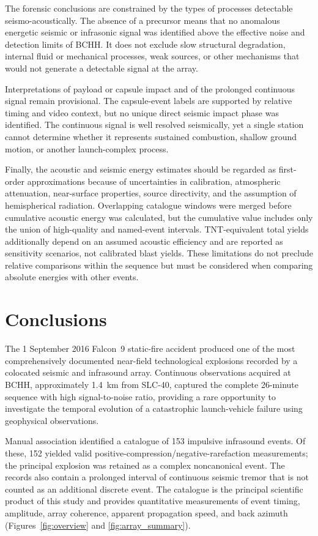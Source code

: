\documentclass[]{seismica}
\begin{document}
The forensic conclusions are constrained by the types of processes detectable
seismo-acoustically. The absence of a precursor means that no anomalous
energetic seismic or infrasonic signal was identified above the effective noise
and detection limits of BCHH. It does not exclude slow structural degradation,
internal fluid or mechanical processes, weak sources, or other mechanisms that
would not generate a detectable signal at the array.

Interpretations of payload or capsule impact and of the prolonged continuous
signal remain provisional. The capsule-event labels are supported by relative
timing and video context, but no unique direct seismic impact phase was
identified. The continuous signal is well resolved seismically, yet a single
station cannot determine whether it represents sustained combustion, shallow
ground motion, or another launch-complex process.

Finally, the acoustic and seismic energy estimates should be regarded as
first-order approximations because of uncertainties in calibration,
atmospheric attenuation, near-surface properties, source directivity, and the
assumption of hemispherical radiation. Overlapping catalogue windows were
merged before cumulative acoustic energy was calculated, but the cumulative
value includes only the union of high-quality and named-event intervals.
TNT-equivalent total yields additionally depend on an assumed acoustic
efficiency and are reported as sensitivity scenarios, not calibrated blast
yields. These limitations do not preclude relative comparisons within the
sequence but must be considered when comparing absolute energies with other
events.

\section{Conclusions}
\label{sec:conclusions}

The 1 September 2016 Falcon~9 static-fire accident produced one of the most comprehensively documented near-field technological explosions recorded by a colocated seismic and infrasound array. Continuous observations acquired at BCHH, approximately 1.4~km from SLC-40, captured the complete 26-minute sequence with high signal-to-noise ratio, providing a rare opportunity to investigate the temporal evolution of a catastrophic launch-vehicle failure using geophysical observations.

Manual association identified a catalogue of 153 impulsive infrasound events.
Of these, 152 yielded valid positive-compression/negative-rarefaction
measurements; the principal explosion was retained as a complex noncanonical
event. The records also contain a prolonged interval of continuous seismic
tremor that is not counted as an additional discrete event. The catalogue is
the principal scientific product of this study and provides quantitative
measurements of event timing, amplitude, array coherence, apparent propagation
speed, and back azimuth (Figures~\ref{fig:overview} and
\ref{fig:array_summary}).
\end{document}
